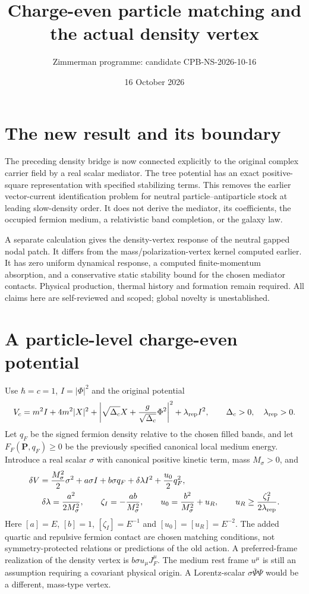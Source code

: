 \documentclass[11pt]{article}
\title{Charge-even particle matching and the actual density vertex}
\author{Zimmerman programme: candidate CPB-NS-2026-10-16}
\date{16 October 2026}
\begin{document}
\maketitle
\section{The new result and its boundary}
The preceding density bridge is now connected explicitly to the original
complex carrier field by a real scalar mediator. The tree potential has
an exact positive-square representation with specified stabilizing terms.
This removes the earlier vector-current identification problem for neutral
particle--antiparticle stock at leading slow-density order. It does not
derive the mediator, its coefficients, the occupied fermion medium, a
relativistic band completion, or the galaxy law.

A separate calculation gives the density-vertex response of the neutral
gapped nodal patch. It differs from the mass/polarization-vertex kernel
computed earlier. It has zero uniform dynamical response, a computed
finite-momentum absorption, and a conservative static stability bound for
the chosen mediator contacts. Physical production, thermal history and
formation remain required. All claims here are self-reviewed and scoped;
global novelty is unestablished.

\section{A particle-level charge-even potential}
Use $\hbar=c=1$, $I=|\Phi|^2$ and the original potential
\begin{equation}
 V_c=m^2I+4m^2|X|^2+
       \left|\sqrt{\Delta_c}X+{g\over\sqrt{\Delta_c}}\Phi^2\right|^2
       +\lambda_{\rm rep}I^2,
 \qquad \Delta_c>0,\quad\lambda_{\rm rep}>0.
\end{equation}
Let $q_F$ be the signed fermion density relative to the chosen filled
bands, and let $F_F(\mathbf P,q_F)\geq0$ be the previously specified
canonical local medium energy. Introduce a real scalar $\sigma$ with
canonical positive kinetic term, mass $M_\sigma>0$, and
\begin{align}
 \delta V={}&{M_\sigma^2\over2}\sigma^2
       +a\sigma I+b\sigma q_F
       +\delta\lambda I^2+{u_0\over2}q_F^2,\\
 \delta\lambda&={a^2\over2M_\sigma^2},\qquad
 \zeta_I=-{ab\over M_\sigma^2},\qquad
 u_0={b^2\over M_\sigma^2}+u_R,\qquad
 u_R\geq{\zeta_I^2\over2\lambda_{\rm rep}}.
 \label{ns:parameters}
\end{align}
Here $[a]=E$, $[b]=1$, $[\zeta_I]=E^{-1}$ and $[u_0]=[u_R]=E^{-2}$.
The added quartic and repulsive fermion contact are chosen matching
conditions, not symmetry-protected relations or predictions of the old
action. A preferred-frame realization of the density vertex is
$b\sigma u_\mu J_F^\mu$. The medium rest frame $u^\mu$ is still an
assumption requiring a covariant physical origin. A Lorentz-scalar
$\sigma\bar\Psi\Psi$ would be a different, mass-type vertex.
\end{document}
